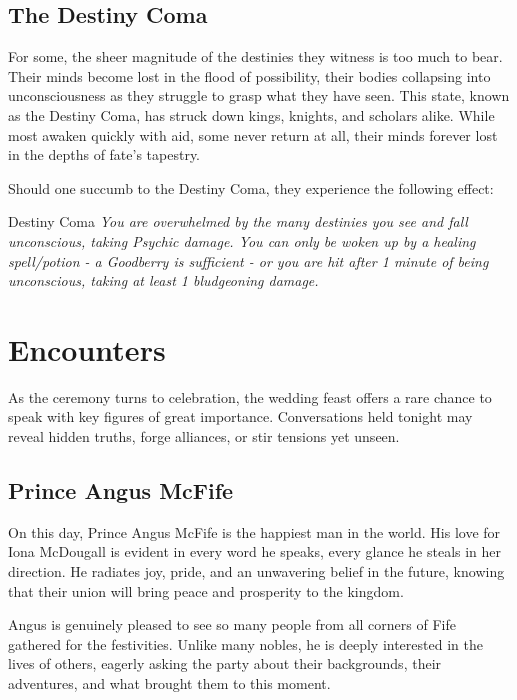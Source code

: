 \subsection*{The Destiny Coma}
{\entryfont For some, the sheer magnitude of the destinies they witness is too much to bear. Their minds become lost in the flood of possibility, their bodies collapsing into unconsciousness as they struggle to grasp what they have seen. This state, known as the Destiny Coma, has struck down kings, knights, and scholars alike. While most awaken quickly with aid, some never return at all, their minds forever lost in the depths of fate's tapestry.

Should one succumb to the Destiny Coma, they experience the following effect:}
\begingroup
	\DndSetThemeColor[PhbMauve]
	\begin{DndComment}{Destiny Coma}
		\textit{You are overwhelmed by the many destinies you see and fall unconscious, taking  Psychic damage. You can only be woken up by a healing spell/potion - a Goodberry is sufficient - or you are hit after 1 minute of being unconscious, taking at least 1 bludgeoning damage.}
	\end{DndComment}
\endgroup
\vfill\clearpage
\section*{Encounters}
{\entryfont As the ceremony turns to celebration, the wedding feast offers a rare chance to speak with key figures of great importance. Conversations held tonight may reveal hidden truths, forge alliances, or stir tensions yet unseen.}

\subsection*{Prince Angus McFife}
{\entryfont On this day, Prince Angus McFife is the happiest man in the world. His love for Iona McDougall is evident in every word he speaks, every glance he steals in her direction. He radiates joy, pride, and an unwavering belief in the future, knowing that their union will bring peace and prosperity to the kingdom.

Angus is genuinely pleased to see so many people from all corners of Fife gathered for the festivities. Unlike many nobles, he is deeply interested in the lives of others, eagerly asking the party about their backgrounds, their adventures, and what brought them to this moment.}
